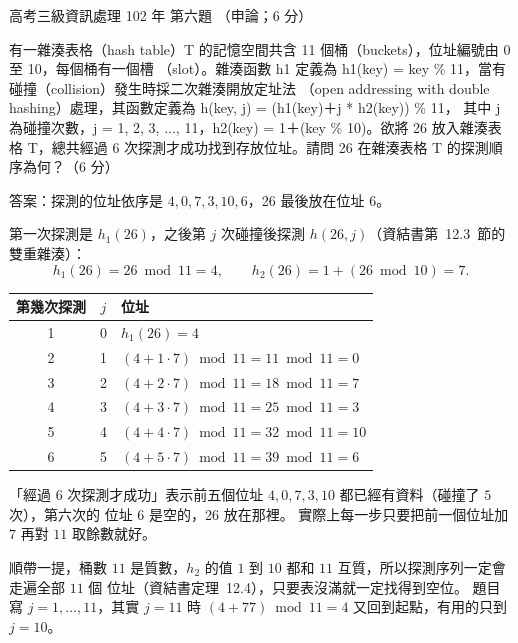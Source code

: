 \begin{pastexam}[label={px:gk3-102-ds-06}]{高考三級資訊處理 102 年 第六題}
（申論；6 分）

有一雜湊表格（hash table）T 的記憶空間共含 11 個桶（buckets），位址編號由 0 至 10，每個桶有一個槽
（slot）。雜湊函數 h1 定義為 h1(key) = key \% 11，當有碰撞（collision）發生時採二次雜湊開放定址法
（open addressing with double hashing）處理，其函數定義為 h(key, j) = (h1(key)＋j * h2(key)) \% 11，
其中 j 為碰撞次數，j = 1, 2, 3, ..., 11，h2(key) = 1＋(key \% 10)。欲將 26 放入雜湊表格 T，總共經過
6 次探測才成功找到存放位址。請問 26 在雜湊表格 T 的探測順序為何？（6 分）
\end{pastexam}

\begin{pastsoln}
答案：探測的位址依序是 $4, 0, 7, 3, 10, 6$，26 最後放在位址 $6$。

第一次探測是 $h_1(26)$，之後第 $j$ 次碰撞後探測 $h(26, j)$（資結書第~12.3~節的雙重雜湊）：
\[
h_1(26) = 26 \bmod 11 = 4, \qquad h_2(26) = 1 + (26 \bmod 10) = 7 .
\]
\begin{center}
\small
\begin{tabular}{ccl}
\toprule
第幾次探測 & $j$ & 位址 \\
\midrule
1 & 0 & $h_1(26) = 4$ \\
2 & 1 & $(4 + 1 \cdot 7) \bmod 11 = 11 \bmod 11 = 0$ \\
3 & 2 & $(4 + 2 \cdot 7) \bmod 11 = 18 \bmod 11 = 7$ \\
4 & 3 & $(4 + 3 \cdot 7) \bmod 11 = 25 \bmod 11 = 3$ \\
5 & 4 & $(4 + 4 \cdot 7) \bmod 11 = 32 \bmod 11 = 10$ \\
6 & 5 & $(4 + 5 \cdot 7) \bmod 11 = 39 \bmod 11 = 6$ \\
\bottomrule
\end{tabular}
\end{center}
「經過 6 次探測才成功」表示前五個位址 $4, 0, 7, 3, 10$ 都已經有資料（碰撞了 $5$ 次），第六次的
位址 $6$ 是空的，26 放在那裡。 實際上每一步只要把前一個位址加 $7$ 再對 $11$ 取餘數就好。

順帶一提，桶數 $11$ 是質數，$h_2$ 的值 $1$ 到 $10$ 都和 $11$ 互質，所以探測序列一定會走遍全部 $11$ 個
位址（資結書定理~12.4），只要表沒滿就一定找得到空位。 題目寫 $j = 1, \ldots, 11$，其實 $j = 11$
時 $(4 + 77) \bmod 11 = 4$ 又回到起點，有用的只到 $j = 10$。
\end{pastsoln}
